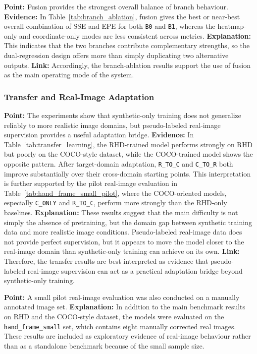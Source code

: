 \documentclass[10pt,letterpaper]{article}
\begin{document}
\medskip
\noindent\textbf{Point:} Fusion provides the strongest overall balance of branch behaviour.  
\textbf{Evidence:} In Table~\ref{tab:branch_ablation}, fusion gives the best or near-best overall combination of SSE and EPE for both \texttt{B0} and \texttt{B1}, whereas the heatmap-only and coordinate-only modes are less consistent across metrics.  
\textbf{Explanation:} This indicates that the two branches contribute complementary strengths, so the dual-regression design offers more than simply duplicating two alternative outputs.  
\textbf{Link:} Accordingly, the branch-ablation results support the use of fusion as the main operating mode of the system.

\subsubsection{Transfer and Real-Image Adaptation}

\medskip
\noindent\textbf{Point:} The experiments show that synthetic-only training does not generalize reliably to more realistic image domains, but pseudo-labeled real-image supervision provides a useful adaptation bridge.  
\textbf{Evidence:} In Table~\ref{tab:transfer_learning}, the RHD-trained model performs strongly on RHD but poorly on the COCO-style dataset, while the COCO-trained model shows the opposite pattern. After target-domain adaptation, \texttt{R\_TO\_C} and \texttt{C\_TO\_R} both improve substantially over their cross-domain starting points. This interpretation is further supported by the pilot real-image evaluation in Table~\ref{tab:hand_frame_small_pilot}, where the COCO-oriented models, especially \texttt{C\_ONLY} and \texttt{R\_TO\_C}, perform more strongly than the RHD-only baselines.  
\textbf{Explanation:} These results suggest that the main difficulty is not simply the absence of pretraining, but the domain gap between synthetic training data and more realistic image conditions. Pseudo-labeled real-image data does not provide perfect supervision, but it appears to move the model closer to the real-image domain than synthetic-only training can achieve on its own.  
\textbf{Link:} Therefore, the transfer results are best interpreted as evidence that pseudo-labeled real-image supervision can act as a practical adaptation bridge beyond synthetic-only training.

\medskip
\noindent\textbf{Point:} A small pilot real-image evaluation was also conducted on a manually annotated image set.  
\textbf{Explanation:} In addition to the main benchmark results on RHD and the COCO-style dataset, the models were evaluated on the \texttt{hand\_frame\_small} set, which contains eight manually corrected real images. These results are included as exploratory evidence of real-image behaviour rather than as a standalone benchmark because of the small sample size.
\end{document}
